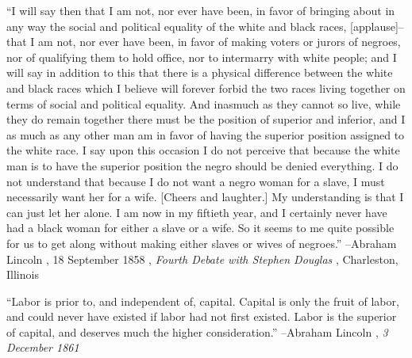 \documentclass{article}%
\begin{document}
\begin{minipage}{\textwidth}%
\flushleft%
“I will say then that I am not, nor ever have been, in favor of bringing about in any way the social and political equality of the white and black races,  {[}applause{]}–that I am not, nor ever have been, in favor of making voters or  jurors of negroes, nor of qualifying them to hold office, nor to intermarry with  white people; and I will say in addition to this that there is a physical difference  between the white and black races which I believe will forever forbid the two races  living together on terms of social and political equality. And inasmuch as they  cannot so live, while they do remain together there must be the position of superior and inferior, and I as much as any other man am in favor of having the superior position assigned to the white race. I say upon this occasion I do not perceive that because the white man is to have the superior position the negro should be denied everything. I do not understand that because I do not want a negro woman for a slave, I must necessarily want her for a wife. {[}Cheers and laughter.{]} My understanding is that I can just let her alone. I am now in my fiftieth year, and I certainly never have had a black woman for either a slave or a wife. So it seems to me quite possible for us to get along without making either slaves or wives of negroes.”%
\linebreak%
\vspace{1mm}%
–Abraham Lincoln%
, 18 September 1858%
, \textit{Fourth Debate with Stephen Douglas}%
, Charleston, Illinois%
\linebreak%
\vspace{1mm}%
\end{minipage}%
\linebreak%
\vspace{1mm}%
\begin{minipage}{\textwidth}%
\flushleft%
“Labor is prior to, and independent of, capital. Capital is only the fruit of labor, and could never have existed if labor had not first existed. Labor is the superior of capital, and deserves much the higher consideration.”%
\linebreak%
\vspace{1mm}%
–Abraham Lincoln%
, \textit{3 December 1861}%
\linebreak%
\vspace{1mm}%
\end{minipage}%
\linebreak%
\vspace{1mm}%
\end{document}
